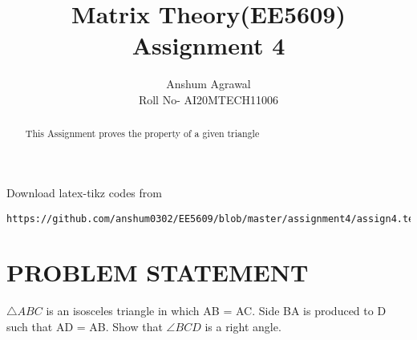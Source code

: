 \documentclass[journal,12pt,twocolumn]{IEEEtran}
\begin{document}
\makeatother
\let\StandardTheFigure\thefigure
\let\vec\mathbf
\renewcommand{\thefigure}{\theproblem}
\def\putbox#1#2#3{\makebox[0in][l]{\makebox[#1][l]{}\raisebox{\baselineskip}[0in][0in]{\raisebox{#2}[0in][0in]{#3}}}}
     \def\rightbox#1{\makebox[0in][r]{#1}}
     \def\centbox#1{\makebox[0in]{#1}}
     \def\topbox#1{\raisebox{-\baselineskip}[0in][0in]{#1}}
     \def\midbox#1{\raisebox{-0.5\baselineskip}[0in][0in]{#1}}
\vspace{3cm}
\title{Matrix Theory(EE5609) Assignment 4}
\author{Anshum Agrawal \\ Roll No- AI20MTECH11006}
%
\maketitle
\newpage
\bigskip
\renewcommand{\thefigure}{\theenumi}
\renewcommand{\thetable}{\theenumi}
\begin{abstract}
  This Assignment proves the property of a given triangle 
\end{abstract}
%
Download latex-tikz codes from 
%
\begin{lstlisting}
https://github.com/anshum0302/EE5609/blob/master/assignment4/assign4.tex
\end{lstlisting}
%
\section{\textbf{PROBLEM STATEMENT}}
$\triangle{ABC}$ is an isosceles triangle in which AB = AC. Side BA is produced to D such that AD = AB. Show that $\angle{BCD}$ is a right angle.
\end{document}
